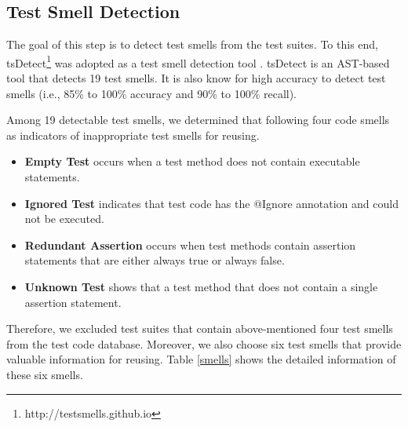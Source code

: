 \documentclass[conference]{IEEEtran}
\begin{document}

\subsection{Test Smell Detection}
The goal of this step is to detect test smells from the test suites. To this end, \textsf{tsDetect}\footnote{http://testsmells.github.io} was adopted as a test smell detection tool \cite{b9}. \textsf{tsDetect} is an AST-based tool that detects 19 test smells. It is also know for high accuracy to detect test smells (i.e., 85\% to 100\% accuracy and 90\% to 100\% recall). 

Among 19 detectable test smells, we determined that following four code smells as indicators of inappropriate test smells for reusing. 

\begin{itemize}
\item \textbf{Empty Test} occurs when a test method does not contain executable statements.
\item \textbf{Ignored Test} indicates that test code has the @Ignore annotation and could not be executed.
\item \textbf{Redundant Assertion} occurs when test methods contain assertion statements that are either always true or always false. 
\item \textbf{Unknown Test} shows that a test method that does not contain a single assertion statement.
\end{itemize}

Therefore, we excluded test suites that contain above-mentioned four test smells from the test code database. Moreover, we also choose six test smells that provide valuable information for reusing. Table \ref{smells} shows the detailed information of these six smells. 
\end{document}
